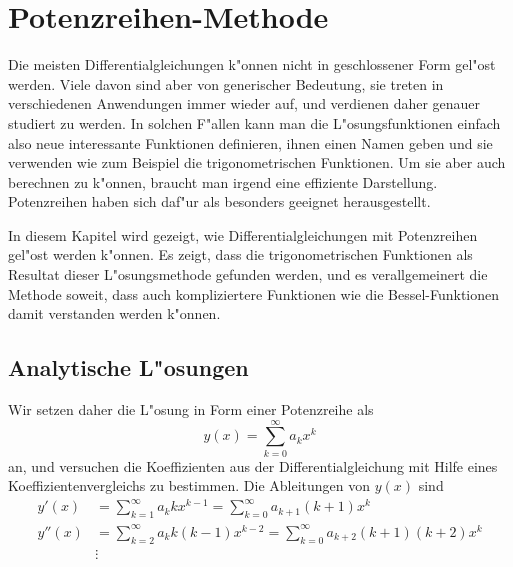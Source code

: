 %
%
%
\chapter{Potenzreihen-Methode\label{chapter:potenzreihen}}
\lhead{}
Die meisten Differentialgleichungen k"onnen nicht in geschlossener
Form gel"ost werden.
Viele davon sind aber von generischer Bedeutung, sie treten
in verschiedenen Anwendungen immer wieder auf, und verdienen daher
genauer studiert zu werden.
In solchen F"allen kann man die L"osungsfunktionen einfach also
neue interessante Funktionen definieren, ihnen einen Namen geben
und sie verwenden wie zum Beispiel die trigonometrischen Funktionen.
Um sie aber auch berechnen zu k"onnen, braucht man irgend eine 
effiziente Darstellung.
Potenzreihen haben sich daf"ur als besonders geeignet herausgestellt.

In diesem Kapitel wird gezeigt, wie Differentialgleichungen mit Potenzreihen
gel"ost werden k"onnen.
Es zeigt, dass die trigonometrischen Funktionen als Resultat
dieser L"osungsmethode gefunden werden, und es verallgemeinert die
Methode soweit, dass auch kompliziertere Funktionen wie die
Bessel-Funktionen damit verstanden werden k"onnen.

\section{Analytische L"osungen
\label{section:potenzreihen:analytisch}}
Wir setzen daher die L"osung in Form einer Potenzreihe als
\begin{equation}
y(x)
=
\sum_{k=0}^\infty a_kx^k
\label{potenzreihen:ansatz}
\end{equation}
an, und versuchen die Koeffizienten aus der Differentialgleichung mit
Hilfe eines Koeffizientenvergleichs zu bestimmen.
Die Ableitungen von $y(x)$ sind
\begin{equation}
\begin{aligned}
y'(x)
&=
\sum_{k=1}^\infty a_kkx^{k-1}
=
\sum_{k=0}^\infty a_{k+1}(k+1)x^k
\\
y''(x)
&=
\sum_{k=2}^\infty a_kk(k-1)x^{k-2}
=
\sum_{k=0}^\infty a_{k+2}(k+1)(k+2)x^k 
\\
&\vdots
\end{aligned}
\label{potenzreihen:ableitungen}
\end{equation}

